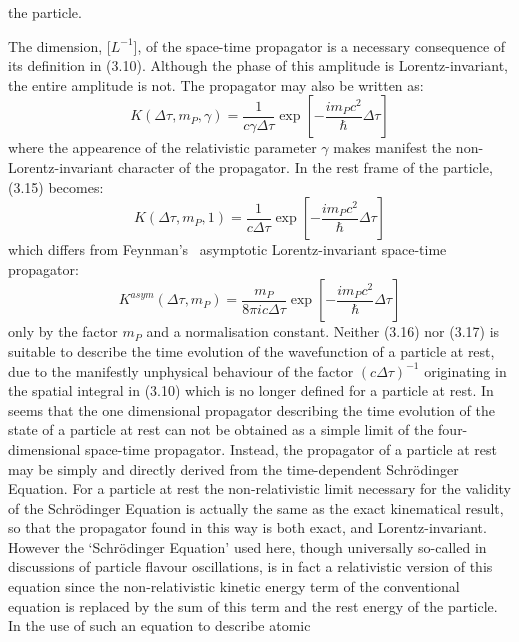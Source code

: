 {    the particle.
    \par The dimension, [$L^{-1}$], of the space-time propagator is a necessary consequence of its definition
     in (3.10). Although the phase of this amplitude is Lorentz-invariant, the entire amplitude is not.
     The propagator may also be written as:
      \begin{equation}
   K( \Delta \tau, m_P, \gamma)  =   \frac{1}{ c \gamma \Delta \tau}
 \exp\left[-\frac{i m_P c^2}{\hbar} \Delta  \tau\right]
       \end{equation}
   where the appearence of the relativistic parameter $\gamma$ makes manifest the non-Lorentz-invariant
  character of the propagator.
  In the rest frame of the particle,  (3.15) becomes:
     \begin{equation}
   K( \Delta \tau, m_P, 1)  =   \frac{1}{ c \Delta \tau }
 \exp\left[-\frac{i m_P c^2}{\hbar} \Delta  \tau\right]
       \end{equation}
  which differs from Feynman's~\cite{Feynprop} asymptotic Lorentz-invariant space-time propagator:
     \begin{equation}
   K^{asym}( \Delta \tau, m_P)  =   \frac{m_P}{ 8 \pi i c \Delta \tau }
 \exp\left[-\frac{i m_P c^2}{\hbar} \Delta  \tau\right]
       \end{equation}
  only by the factor $m_P$ and a normalisation constant.
  Neither (3.16) nor (3.17) is suitable to describe the time
 evolution of the wavefunction of a particle at rest, due to the manifestly 
  unphysical behaviour of the factor $(c\Delta  \tau)^{-1}$ originating in the spatial
 integral in (3.10) which is no longer defined for a particle at rest.
  In seems that the one dimensional propagator describing the time evolution 
  of the state of a particle at rest can not be obtained as a simple
  limit of the four-dimensional space-time propagator. Instead, the propagator
 of a particle at rest may be simply and directly derived from
  the time-dependent Schr\"{o}dinger Equation. For a particle at rest
  the non-relativistic limit necessary for the validity of the Schr\"{o}dinger Equation
  is actually the same as the exact kinematical result, so that the propagator found
 in this way is both exact, and Lorentz-invariant.
   However the `Schr\"{o}dinger Equation' used here, though universally so-called 
  in discussions of particle flavour oscillations, is in fact a relativistic 
  version of this equation since the non-relativistic kinetic energy term 
 of the conventional equation is replaced by the sum of this term and the rest
  energy of the particle. In the use of such an equation to describe atomic
}
